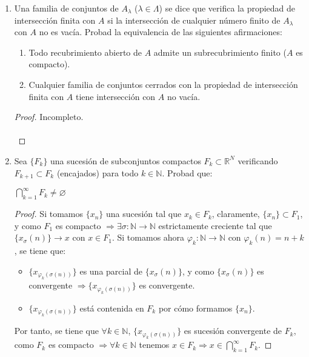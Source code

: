 \documentclass[a4paper, 11pt]{article} %
\let\emptyset\varnothing
\begin{document}
\begin{enumerate}
\begin{proof}
	\end{proof}
	\item Una familia de conjuntos de $A_\lambda$ ($\lambda \in \Lambda$) se dice que verifica la propiedad de intersección finita con $A$ si la intersección de cualquier número finito de $A_\lambda$ con $A$ no es vacía. Probad la equivalencia de las siguientes afirmaciones:
	\begin{enumerate}[label=\alph*)]
		\item Todo recubrimiento abierto de $A$ admite un subrecubrimiento finito ($A$ es compacto).\label{compacto}
		\item Cualquier familia de conjuntos cerrados con la propiedad de intersección finita con $A$ tiene intersección con $A$ no vacía.\label{intersección}
	\end{enumerate}
	\begin{proof}
		Incompleto.\\
		\fbox{\ref{compacto} $\Rightarrow$  \ref{intersección}} \\
		\fbox{\ref{intersección} $\Rightarrow$  \ref{compacto}}
	\end{proof}
	\item Sea $\{F_k\}$ una sucesión de subconjuntos compactos $F_k \subset \mathbb{R}^N$ verificando $F_{k+1} \subset F_k$ (encajados) para todo $k \in \mathbb{N}$. Probad que:
	\begin{center}
		$\displaystyle{\bigcap_{k=1}^\infty F_k \neq \emptyset}$
	\end{center}
	\begin{proof}
		Si tomamos $\{x_n\}$ una sucesión tal que $x_k \in F_k$, claramente, $\{x_n\} \subset F_1$, y como $F_1$ es compacto $\Rightarrow \exists \sigma: \mathbb{N} \rightarrow \mathbb{N}$ estrictamente creciente tal que $\{x_\sigma(n)\} \rightarrow x$ con $x \in F_1$. Si tomamos ahora $\varphi_k: \mathbb{N} \rightarrow \mathbb{N}$ con $\varphi_k(n) = n+k$, se tiene que:
		\begin{itemize}
			\item $\{x_{\varphi_k(\sigma(n))}\}$ es una parcial de $\{x_\sigma(n)\}$, y como $\{x_\sigma(n)\}$ es convergente $\Rightarrow \{x_{\varphi_k(\sigma(n))}\}$ es convergente.
			\item $\{x_{\varphi_k(\sigma(n))}\}$ está contenida en $F_k$ por cómo formamos $\{x_n\}$.
		\end{itemize}
		Por tanto, se tiene que $\forall k \in \mathbb{N}$, $\{x_{\varphi_k(\sigma(n))}\}$ es sucesión convergente de $F_k$, como $F_k$ es compacto $\Rightarrow \forall k \in \mathbb{N}$ tenemos $x \in F_k \Rightarrow x \in \displaystyle{\bigcap_{k=1}^\infty F_k}$.

\end{proof}
\end{enumerate}
\end{document}
